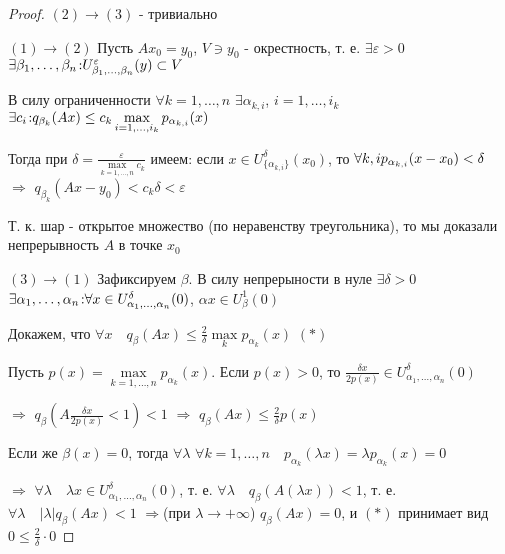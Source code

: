 \documentclass[a4paper,12pt]{report}
\begin{document}
\begin{proof}
$(2)\to(3)$ - тривиально

$(1)\to(2)$ Пусть $Ax_0=y_0$, $V\ni y_0$ - окрестность, т. е. $\exists\varepsilon>0$ $\exists\beta_1,\ldots,\beta_n\colon \\U_{\beta_1,\ldots,\beta_n}^\varepsilon(y)\subset V$

В силу ограниченности $\forall k=1,\ldots,n$ $\exists\alpha_{k,i}$, $i=1,\ldots,i_k$ $\exists c_i\colon\\ q_{\beta_k}(Ax)\le c_k\max\limits_{i=1,\ldots,i_k}p_{\alpha_{k,i}}(x)$

Тогда при $\delta=\displaystyle\frac{\varepsilon}{\max\limits_{k=1,\ldots,n}c_k}$ имеем: если $x\in U_{\{\alpha_{k,i}\}}^\delta(x_0)$, то $\forall k,i\\ p_{\alpha_{k,i}}(x-x_0)<\delta$ $\Rightarrow$ $q_{\beta_k}(Ax-y_0)<c_k\delta<\varepsilon$

Т. к. шар - открытое множество (по неравенству треугольника), то мы доказали непрерывность $A$ в точке $x_0$

$(3)\to(1)$ Зафиксируем $\beta$. В силу непрерыности в нуле $\exists\delta>0$ $\exists\alpha_1,\ldots,\alpha_n\colon\\\forall x\in U_{\alpha_1,\ldots,\alpha_n}^\delta(0)$, $\alpha x\in U_\beta^1(0)$

Докажем, что $\forall x\quad q_\beta(Ax)\le\frac2\delta\max\limits_k p_{\alpha_k}(x)$ $(*)$

Пусть $p(x)=\max\limits_{k=1,\ldots,n}p_{\alpha_k}(x)$. Если $p(x)>0$, то $\frac{\delta x}{2p(x)}\in U_{\alpha_1,\ldots,\alpha_n}^\delta(0)$ 

$\Rightarrow$ $q_\beta\left(A\frac{\delta x}{2p(x)}<1\right)<1$ $\Rightarrow$ $q_\beta(Ax)\le\frac2\delta p(x)$

Если же $\beta(x)=0$, тогда $\forall\lambda$ $\forall k=1,\ldots,n\quad p_{\alpha_k}(\lambda x)=\lambda p_{\alpha_k}(x)=0$

$\Rightarrow$ $\forall\lambda\quad\lambda x\in U_{\alpha_1,\ldots,\alpha_n}^\delta(0)$, т. е. $\forall\lambda\quad q_\beta\left(A(\lambda x)\right)<1$, т. е. $\forall\lambda\quad|\lambda|q_\beta(Ax)<1$ $\Rightarrow$(при $\lambda\to+\infty$) $q_\beta(Ax)=0$, и $(*)$ принимает вид $0\le\frac2\delta\cdot0$
\end{proof}
 
\end{document}
